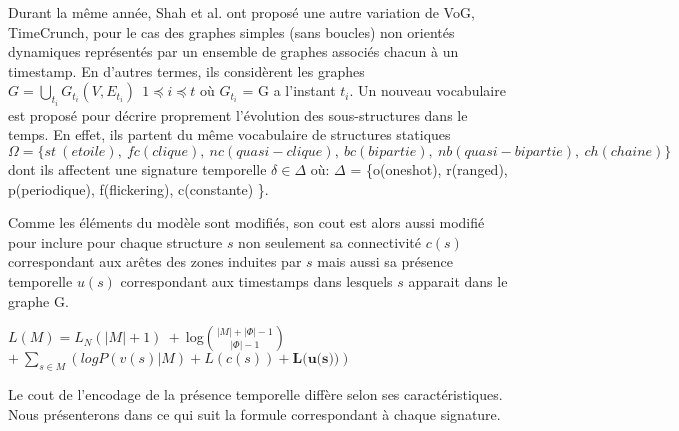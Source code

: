 Durant la même année, Shah et al.\citep{shah2015timecrunch} ont proposé une autre variation de VoG, TimeCrunch, pour le cas des graphes simples (sans boucles) non orientés dynamiques représentés par un ensemble de graphes associés chacun à un timestamp. En d'autres termes, ils considèrent les graphes $\displaystyle{G=\bigcup_{t_{i}}G_{t_{i}}(V,E_{t_{i}})}\ \ 1 \preceq i \preceq t$ où $G_{t_{i}}$ = G a l'instant $t_{i}$.
			Un nouveau vocabulaire est proposé pour décrire proprement l'évolution des sous-structures dans le temps. En effet, ils partent du même vocabulaire de structures statiques 
			$\Omega =\{ st\ (etoile),\ fc (clique),\ nc (quasi-clique),\ bc (bipartie),\ nb (quasi-bipartie),\ ch (chaine)\}$ 
			dont ils affectent une signature temporelle $\delta \in \Delta$ où: $\Delta$ = \{o(oneshot), r(ranged), p(periodique), f(flickering), c(constante) \}. 
			
			 Comme les éléments du modèle sont modifiés, son cout est alors aussi modifié pour inclure pour chaque structure $s$ non seulement sa connectivité $c(s)$ correspondant aux arêtes des zones induites par $s$ mais aussi sa présence temporelle $u(s)$ correspondant aux timestamps dans lesquels $s$ apparait dans le graphe G. 
			 
			 $L(M) = L_{N}(|M|+1)\ +\ $log${|M|+|\Phi|-1}\choose{|\Phi|-1}$ $+\ \displaystyle{\sum_{s\in M}(logP(v(s)|M) + L(c(s)) + \textbf{L(u(s))})}$
			 
			 Le cout de l'encodage de la présence temporelle diffère selon ses caractéristiques. Nous présenterons dans ce qui suit la formule correspondant à chaque signature.

